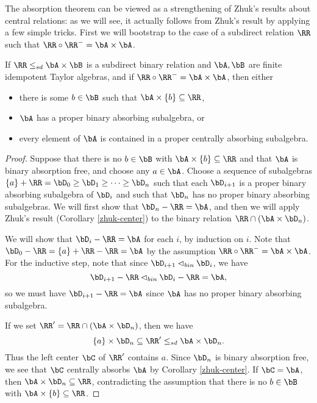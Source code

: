 The absorption theorem can be viewed as a strengthening of Zhuk's results about central relations: as we will see, it actually follows from Zhuk's result by applying a few simple tricks. First we will bootstrap to the case of a subdirect relation $\RR$ such that $\RR \circ \RR^- = \bA\times \bA$.

\begin{lem} If $\RR \le_{sd} \bA \times \bB$ is a subdirect binary relation and $\bA,\bB$ are finite idempotent Taylor algebras, and if $\RR \circ \RR^- = \bA \times \bA$, then either
\begin{itemize}
\item there is some $b \in \bB$ such that $\bA \times \{b\} \subseteq \RR$,
\item $\bA$ has a proper binary absorbing subalgebra, or
\item every element of $\bA$ is contained in a proper centrally absorbing subalgebra.
\end{itemize}
\end{lem}
\begin{proof} Suppose that there is no $b \in \bB$ with $\bA \times \{b\} \subseteq \RR$ and that $\bA$ is binary absorption free, and choose any $a \in \bA$. Choose a sequence of subalgebras $\{a\} + \RR = \bD_0 \ge \bD_1 \ge \cdots \ge \bD_n$ such that each $\bD_{i+1}$ is a proper binary absorbing subalgebra of $\bD_i$ and such that $\bD_n$ has no proper binary absorbing subalgebras. We will first show that $\bD_n - \RR = \bA$, and then we will apply Zhuk's result (Corollary \ref{zhuk-center}) to the binary relation $\RR \cap (\bA \times \bD_n)$.

We will show that $\bD_i - \RR = \bA$ for each $i$, by induction on $i$. Note that $\bD_0 - \RR = \{a\} + \RR - \RR = \bA$ by the assumption $\RR\circ \RR^- = \bA\times \bA$. For the inductive step, note that since $\bD_{i+1} \lhd_{bin} \bD_i$, we have
\[
\bD_{i+1} - \RR \lhd_{bin} \bD_i - \RR = \bA,
\]
so we must have $\bD_{i+1} - \RR = \bA$ since $\bA$ has no proper binary absorbing subalgebra.

If we set $\RR' = \RR \cap (\bA \times \bD_n)$, then we have
\[
\{a\} \times \bD_n \subseteq \RR' \le_{sd} \bA \times \bD_n.
\]
Thus the left center $\bC$ of $\RR'$ contains $a$. Since $\bD_n$ is binary absorption free, we see that $\bC$ centrally absorbs $\bA$ by Corollary \ref{zhuk-center}. If $\bC = \bA$, then $\bA\times\bD_n \subseteq\RR$, contradicting the assumption that there is no $b \in \bB$ with $\bA \times \{b\} \subseteq \RR$.
\end{proof}

